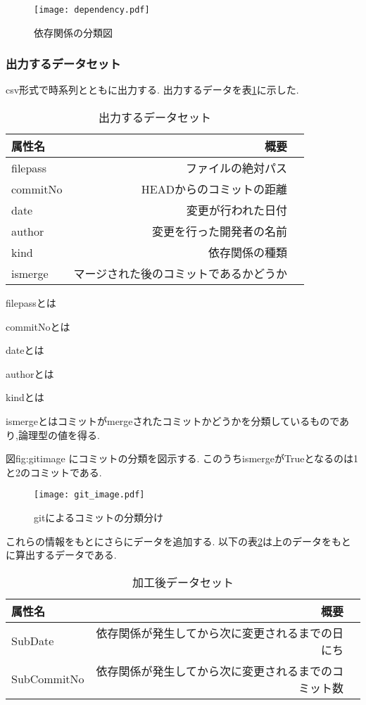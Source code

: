 \documentclass[submit,ses,noauthor]{ipsj} %
\begin{document}
\begin{figure*}[t]
\centering
\texttt{[image: dependency.pdf]}
\caption{依存関係の分類図}
\label{fig:dependency} 
\end{figure*}


\subsubsection{出力するデータセット}
csv形式で時系列とともに出力する.
出力するデータを表\ref{tab:初期データセット}に示した.


\begin{table}[htb]
\caption{出力するデータセット}
\begin{tabular}{|l|r|r|} \hline
属性名 & 概要 \\ \hline
filepass & ファイルの絶対パス \\ \hline
commitNo & HEADからのコミットの距離 \\ \hline
date & 変更が行われた日付 \\ \hline
author & 変更を行った開発者の名前 \\ \hline
kind & 依存関係の種類 \\ \hline
ismerge & マージされた後のコミットであるかどうか \\ \hline
\end{tabular}
\label{tab:初期データセット}
\end{table}

filepassとは

commitNoとは

dateとは

authorとは

kindとは

ismergeとはコミットがmergeされたコミットかどうかを分類しているものであり,論理型の値を得る.

図{fig:gitimage} にコミットの分類を図示する.
このうちismergeがTrueとなるのは1と2のコミットである.

\begin{figure*}[t]
\centering
\texttt{[image: git\_image.pdf]}
\caption{gitによるコミットの分類分け}
\label{fig:gitimage} 
\end{figure*}




これらの情報をもとにさらにデータを追加する.
以下の表\ref{tab:加工後データセット}は上のデータをもとに算出するデータである.

\begin{table}[htb]
\caption{加工後データセット}
\begin{tabular}{|l|r|r|} \hline
属性名 & 概要 \\ \hline
SubDate & 依存関係が発生してから次に変更されるまでの日にち \\ \hline
SubCommitNo & 依存関係が発生してから次に変更されるまでのコミット数 \\ \hline
\end{tabular}
\label{tab:加工後データセット}
\end{table}
\end{document}
